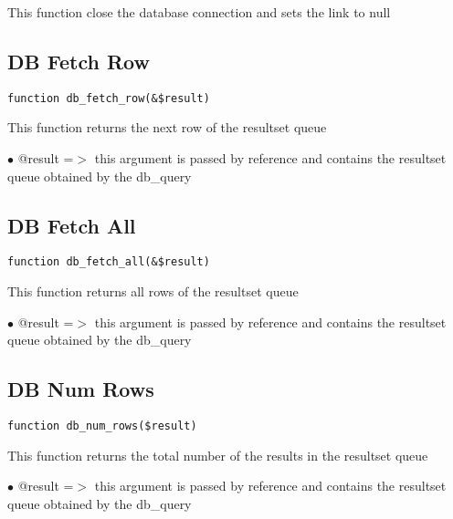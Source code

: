 \documentclass[a4paper]{book}
\begin{document}
This function close the database connection and sets the link to null

\hypertarget{toc66}{}
\subsection{DB Fetch Row}

\begin{lstlisting}
function db_fetch_row(&$result)
\end{lstlisting}

This function returns the next row of the resultset queue

\begin{compactitem}
\item[\color{myblue}$\bullet$] @result =$>$ this argument is passed by reference and contains the resultset queue
           obtained by the db\_query
\end{compactitem}

\hypertarget{toc67}{}
\subsection{DB Fetch All}

\begin{lstlisting}
function db_fetch_all(&$result)
\end{lstlisting}

This function returns all rows of the resultset queue

\begin{compactitem}
\item[\color{myblue}$\bullet$] @result =$>$ this argument is passed by reference and contains the resultset queue
           obtained by the db\_query
\end{compactitem}

\hypertarget{toc68}{}
\subsection{DB Num Rows}

\begin{lstlisting}
function db_num_rows($result)
\end{lstlisting}

This function returns the total number of the results in the resultset queue

\begin{compactitem}
\item[\color{myblue}$\bullet$] @result =$>$ this argument is passed by reference and contains the resultset queue
           obtained by the db\_query
\end{compactitem}
\end{document}
